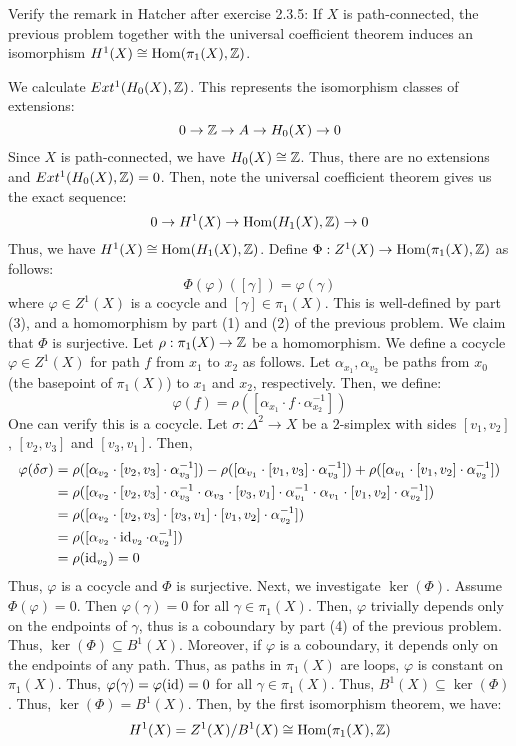 \documentclass[12pt]{article}
\begin{document}
\begin{problem}{3}
Verify the remark in Hatcher after exercise 2.3.5: If $X$ is path-connected, the previous problem together with the universal coefficient theorem induces an isomorphism $H^1(X) \cong \mathrm{Hom}(\pi_1(X), \mathbb Z)$.
\end{problem}
\begin{solution}
    We calculate $Ext^1(H_0(X), \mathbb Z)$. This represents the isomorphism classes of extensions: 
    \[ 0 \to \mathbb Z \to A \to H_0(X) \to 0 \]
    Since $X$ is path-connected, we have $H_0(X) \cong \mathbb Z$. Thus, there are no extensions and $Ext^1(H_0(X), \mathbb Z) = 0$. Then, note the universal coefficient theorem gives us the exact sequence: 
    \[ 0 \to H^1(X) \to \operatorname{Hom}(H_1(X), \mathbb Z) \to 0 \]
    Thus, we have $H^1(X) \cong \operatorname{Hom}(H_1(X), \mathbb Z)$. \bbni
    Define $\Phi: Z^1(X) \to \operatorname{Hom}(\pi_1(X), \mathbb Z)$ as follows:
    \[ \Phi(\varphi)([\gamma]) = \varphi(\gamma) \]
    where $\varphi \in Z^1(X)$ is a cocycle and $[\gamma] \in \pi_1(X)$. This is well-defined by part (3), and a homomorphism by part (1) and (2) of the previous problem. We claim that $\Phi$ is surjective. \bbni
    Let $\rho: \pi_1(X) \to \mathbb Z$ be a homomorphism. We define a cocycle $\varphi \in Z^1(X)$ for path $f$ from $x_1$ to $x_2$ as follows. Let $\alpha_{x_1}, \alpha_{v_2}$ be paths from $x_0$ (the basepoint of $\pi_1(X)$) to $x_1$ and $x_2$, respectively. Then, we define:
    \[ \varphi(f) = \rho([\alpha_{x_1} \cdot f \cdot \alpha_{x_2}^{-1}]) \]
    One can verify this is a cocycle. Let $\sigma: \Delta^2 \to X$ be a $2$-simplex with sides $[v_1, v_2]$, $[v_2, v_3]$ and $[v_3, v_1]$. Then, 
    \begin{align*}
        \varphi(\delta \sigma) &= \rho([\alpha_{v_2} \cdot [v_2, v_3] \cdot \alpha_{v_3}^{-1}]) - \rho([\alpha_{v_1} \cdot [v_1, v_3] \cdot \alpha_{v_3}^{-1}])+ \rho([\alpha_{v_1} \cdot [v_1, v_2] \cdot \alpha_{v_2}^{-1}]) \\
        &= \rho([\alpha_{v_2} \cdot [v_2, v_3] \cdot \alpha_{v_3}^{-1} \cdot \alpha_{v_3} \cdot [v_3, v_1] \cdot \alpha_{v_1}^{-1} \cdot \alpha_{v_1} \cdot [v_1, v_2] \cdot \alpha_{v_2}^{-1}])\\
        &= \rho([\alpha_{v_2} \cdot [v_2, v_3] \cdot [v_3, v_1] \cdot [v_1, v_2] \cdot \alpha_{v_2}^{-1}])\\
        &= \rho([\alpha_{v_2} \cdot \operatorname{id}_{v_2} \cdot \alpha_{v_2}^{-1}])\\
        &= \rho(\operatorname{id}_{v_2}) = 0
    \end{align*}
    Thus, $\varphi$ is a cocycle and $\Phi$ is surjective. \bbni
    Next, we investigate $\ker(\Phi)$. Assume $\Phi(\varphi) = 0$. Then $\varphi(\gamma) = 0$ for all $\gamma \in \pi_1(X)$. Then, $\varphi$ trivially depends only on the endpoints of $\gamma$, thus is a coboundary by part (4) of the previous problem. Thus, $\ker(\Phi) \subseteq B^1(X)$. Moreover, if $\varphi$ is a coboundary, it depends only on the endpoints of any path. Thus, as paths in $\pi_1(X)$ are loops, $\varphi$ is constant on $\pi_1(X)$. Thus, $\varphi(\gamma) = \varphi(\operatorname{id}) = 0$ for all $\gamma \in \pi_1(X)$. Thus, $B^1(X) \subseteq \ker(\Phi)$. Thus, $\ker(\Phi) = B^1(X)$. \bbni
    Then, by the first isomorphism theorem, we have:
    \[ H^1(X) = Z^1(X)/B^1(X) \cong \operatorname{Hom}(\pi_1(X), \mathbb Z) \]
\end{solution}
\newpage
\end{document}
